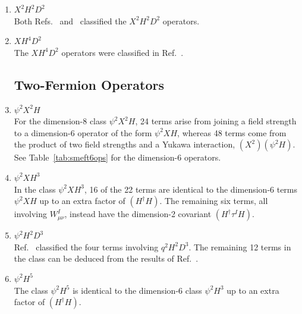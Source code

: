 \begin{enumerate}
\item $X^2H^2D^2$ \\
Both Refs.~\cite{Hays:2018zze} and~\cite{Remmen:2019cyz} classified the $X^2H^2D^2$ operators.

\item $XH^4D^2$ \\
The $XH^4D^2$ operators were classified in Ref.~\cite{Hays:2018zze}.

\subsection{Two-Fermion Operators}

\item $\psi^2X^2H$ \\
For the dimension-8 class $\psi^2X^2H$, 24 terms arise from joining a field strength to a dimension-6 operator of the form $\psi^2XH$, whereas 48 terms come from the product of two field strengths and a Yukawa interaction, $(X^2) (\psi^2H)$.
See Table~\ref{tab:smeft6ops} for the dimension-6 operators.

\item $\psi^2XH^3$ \\
In the class $\psi^2XH^3$, 16 of the 22 terms are identical to the dimension-6 terms $\psi^2XH$ up to an extra factor of $(H^{\dag} H)$.
The remaining six terms, all involving $W^I_{\mu\nu}$, instead have the dimension-2 covariant $(H^{\dag} \tau^I H)$.

\item $\psi^2H^2D^3$ \\
Ref.~\cite{Hays:2018zze} classified the four terms involving $q^2H^2D^3$.
The remaining 12 terms in the class can be deduced from the results of Ref.~\cite{Hays:2018zze}.

\item $\psi^2H^5$ \\
The class $\psi^2H^5$ is identical to the dimension-6 class $\psi^2H^3$ up to an extra factor of $(H^{\dag} H)$.


\end{enumerate}
